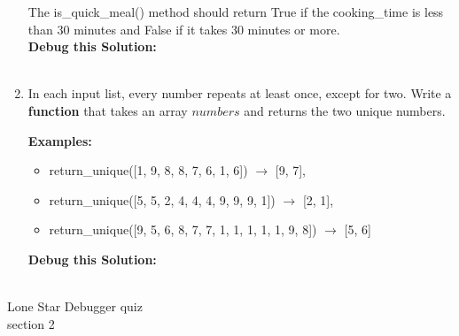\documentclass{article}
\begin{document}
\begin{enumerate}
	The is\_quick\_meal() method should return True if the cooking\_time is less than 30 minutes and False 
	if it takes 30 minutes or more.\\
		
		\textbf{Debug this Solution:}\\
		\mbox{ \hspace*{0.25in}	}

\pagebreak




	\item 	
		In each input list, every number repeats at least once, except for two. Write a \textbf{function} 
		that takes an array $numbers$ and returns the two unique numbers.

		\textbf{Examples:}		
		\begin{itemize}
			\item  return\_unique([1, 9, 8, 8, 7, 6, 1, 6]) $\rightarrow$ [9, 7],
			\item  return\_unique([5, 5, 2, 4, 4, 4, 9, 9, 9, 1]) $\rightarrow$ [2, 1],
			\item  return\_unique([9, 5, 6, 8, 7, 7, 1, 1, 1, 1, 1, 9, 8]) $\rightarrow$ [5, 6]
		\end{itemize}

		\textbf{Debug this Solution:}\\
		\mbox{ \hspace*{0.25in}	}

\pagebreak



\end{enumerate}
\pagebreak
Lone Star \hfill Debugger quiz\\
section 2\\
\end{document}
